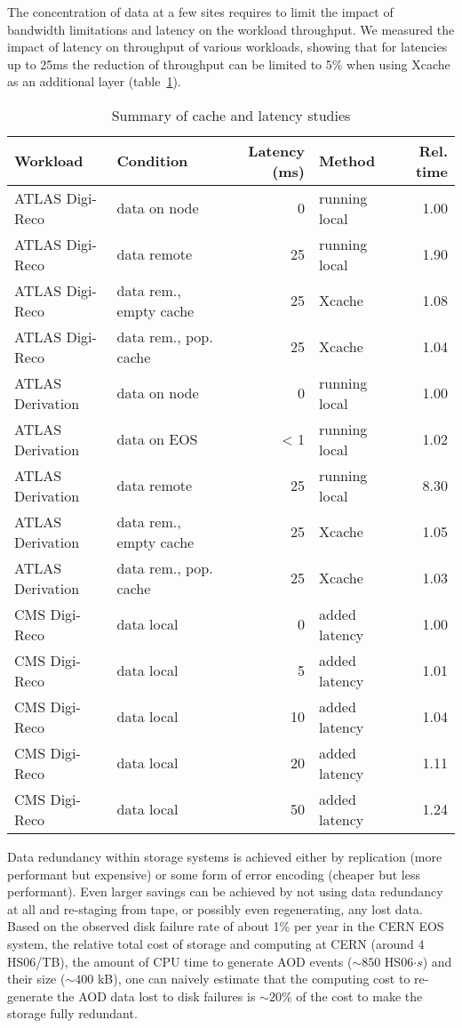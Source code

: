 The concentration of data at a few sites requires to limit the impact
of bandwidth limitations and latency on the workload throughput.  We
measured the impact of latency on throughput of various workloads,
showing that for latencies up to 25ms the reduction of throughput can
be limited to 5\% when using Xcache as an additional layer
(table~\ref{tab:latency}).
\begin{table}
  \centering
  \caption{ Summary of cache and latency studies}
  \label{tab:latency}
  \begin{tabular}{llrlr}
    \hline
    Workload & Condition & Latency (ms) & Method & Rel. time \\\hline
    ATLAS Digi-Reco & data on node & 0 & running local & 1.00 \\ 
    ATLAS Digi-Reco & data remote & ~25 & running local & 1.90 \\ 
    ATLAS Digi-Reco & data rem., empty cache & ~25 & Xcache & 1.08 \\ 
    ATLAS Digi-Reco & data rem., pop. cache & ~25 & Xcache & 1.04 \\ 
    ATLAS Derivation & data on node & 0 & running local & 1.00 \\ 
    ATLAS Derivation & data on EOS & < 1 & running local  & 1.02 \\ 
    ATLAS Derivation & data remote & ~25 & running local & 8.30 \\ 
    ATLAS Derivation & data rem., empty cache & ~25 & Xcache & 1.05 \\ 
    ATLAS Derivation & data rem., pop. cache & ~25 & Xcache & 1.03 \\
    CMS Digi-Reco & data local & 0 & added latency & 1.00 \\
    CMS Digi-Reco & data local & 5 & added latency & 1.01 \\
    CMS Digi-Reco & data local & 10 & added latency & 1.04 \\
    CMS Digi-Reco & data local & 20 & added latency & 1.11 \\
    CMS Digi-Reco & data local & 50 & added latency & 1.24 \\\hline
  \end{tabular}
\end{table}

Data redundancy within storage systems is achieved either by
replication (more performant but expensive) or some form of error
encoding (cheaper but less performant). Even larger savings can be
achieved by not using data redundancy at all and re-staging from
tape, or possibly even regenerating, any lost data.
Based on the observed disk failure rate of about 1\% per year in the
CERN EOS system, the relative total cost
of storage and computing at CERN (around 4 HS06/TB), the amount of CPU
time to generate AOD events ($\sim 850$ HS06$\cdot s$) and their size
($\sim 400$ kB), one can naively estimate that the computing cost to
re-generate the AOD data lost to disk failures is $\sim 20\%$ of the
cost to make the storage fully redundant.

